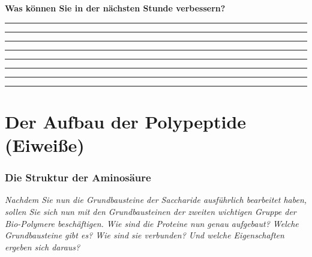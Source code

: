 \documentclass{scrartcl}  %
\begin{document}
\begin{center}
\begin{tcolorbox}
\begin{center}
\begin{tikzpicture}[scale=1]
							\end{tikzpicture}
						\end{center}
						\textbf{{\Large Was können Sie in der nächsten Stunde verbessern?}}
						\begin{center}
							\noindent\rule{12cm}{0.2pt}
							\vspace{1.1cm}
							\noindent\rule{12cm}{0.1pt}
							\vspace{1.1cm}
							\noindent\rule{12cm}{0.1pt}
							\vspace{1.1cm}
							\noindent\rule{12cm}{0.1pt}
							\vspace{1.1cm}
							\noindent\rule{12cm}{0.1pt}
							\vspace{1.1cm}
							\noindent\rule{12cm}{0.1pt}
							\vspace{1.1cm}
							\noindent\rule{12cm}{0.1pt}
							\vspace{1.1cm}
							\noindent\rule{12cm}{0.1pt}
						\end{center}
					\end{tcolorbox}
				\end{center}
								

\newpage

	\part{Der Aufbau der Polypeptide (Eiweiße)}
	
	\section{Die Struktur der Aminosäure}
	
		\textit{Nachdem Sie nun die Grundbausteine der Saccharide ausführlich bearbeitet haben, sollen Sie sich nun mit den Grundbausteinen der zweiten wichtigen Gruppe der Bio-Polymere beschäftigen. Wie sind die Proteine nun genau aufgebaut? Welche Grundbausteine gibt es? Wie sind sie verbunden? Und welche Eigenschaften ergeben sich daraus?} \newline
	
\end{document}
